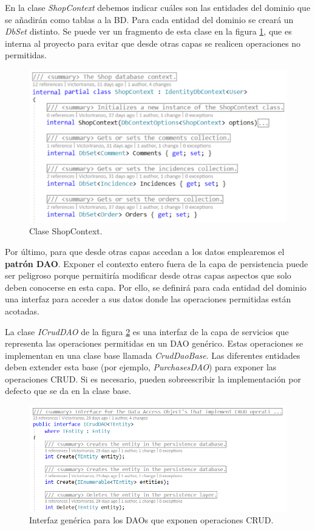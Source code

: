 \documentclass[11pt,spanish,listoffigures]{tfgetsinf}
\begin{document}
En la clase \textit{ShopContext} debemos indicar cuáles son las entidades del dominio que se añadirán como tablas a la BD. Para cada entidad del dominio se creará un \textit{DbSet} distinto. Se puede ver un fragmento de esta clase en la figura \ref{fig:ShopContext}, que es interna al proyecto para evitar que desde otras capas se realicen operaciones no permitidas.

\begin{figure}[h]
\centering
\includegraphics[scale=0.8]{ShopContext}
\caption{Clase ShopContext.}
\label{fig:ShopContext}
\end{figure}

Por último, para que desde otras capas accedan a los datos emplearemos el \textbf{patrón DAO}. Exponer el contexto entero fuera de la capa de persistencia puede ser peligroso porque permitiría modificar desde otras capas aspectos que solo deben conocerse en esta capa. Por ello, se definirá para cada entidad del dominio una interfaz para acceder a sus datos donde las operaciones permitidas están acotadas.

La clase \textit{ICrudDAO} de la figura \ref{fig:ICrudDAO} es una interfaz de la capa de servicios que representa las operaciones permitidas en un DAO genérico. Estas operaciones se implementan en una clase base llamada \textit{CrudDaoBase}. Las diferentes entidades deben extender esta base (por ejemplo, \textit{PurchasesDAO}) para exponer las operaciones CRUD. Si es necesario, pueden sobreescribir la implementación por defecto que se da en la clase base.

\begin{figure}[h]
\centering
\includegraphics[scale=0.8]{ICrudDAO}
\caption{Interfaz genérica para los DAOs que exponen operaciones CRUD.}
\label{fig:ICrudDAO}
\end{figure}
\end{document}
